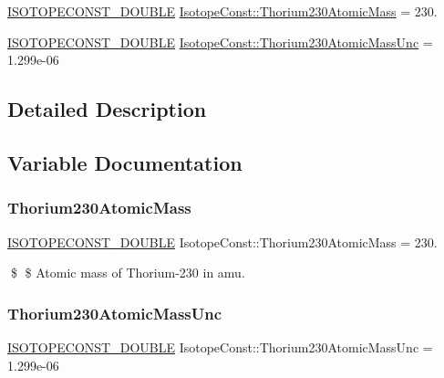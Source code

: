 \begin{DoxyCompactItemize}
\item 
\mbox{\hyperlink{group___isotope_const-_macros_ga8f45a7272ce02c0b4c65c44636ed719a}{I\+S\+O\+T\+O\+P\+E\+C\+O\+N\+S\+T\+\_\+\+D\+O\+U\+B\+LE}} \mbox{\hyperlink{group___isotope_const-_thorium-_th230_ga1b6ff3331cff1716a3ddb1562fb919d6}{Isotope\+Const\+::\+Thorium230\+Atomic\+Mass}} = 230.
\item 
\mbox{\hyperlink{group___isotope_const-_macros_ga8f45a7272ce02c0b4c65c44636ed719a}{I\+S\+O\+T\+O\+P\+E\+C\+O\+N\+S\+T\+\_\+\+D\+O\+U\+B\+LE}} \mbox{\hyperlink{group___isotope_const-_thorium-_th230_ga794d8abb74400c3abca9f6de7f1f3f0f}{Isotope\+Const\+::\+Thorium230\+Atomic\+Mass\+Unc}} = 1.\+299e-\/06
\end{DoxyCompactItemize}


\subsection{Detailed Description}


\subsection{Variable Documentation}
\mbox{\label{group___isotope_const-_thorium-_th230_ga1b6ff3331cff1716a3ddb1562fb919d6}} 
\subsubsection{\texorpdfstring{Thorium230\+Atomic\+Mass}{Thorium230AtomicMass}}
{\footnotesize\ttfamily \mbox{\hyperlink{group___isotope_const-_macros_ga8f45a7272ce02c0b4c65c44636ed719a}{I\+S\+O\+T\+O\+P\+E\+C\+O\+N\+S\+T\+\_\+\+D\+O\+U\+B\+LE}} Isotope\+Const\+::\+Thorium230\+Atomic\+Mass = 230.}

\$ \$ Atomic mass of Thorium-\/230 in amu. \mbox{\label{group___isotope_const-_thorium-_th230_ga794d8abb74400c3abca9f6de7f1f3f0f}} 
\subsubsection{\texorpdfstring{Thorium230\+Atomic\+Mass\+Unc}{Thorium230AtomicMassUnc}}
{\footnotesize\ttfamily \mbox{\hyperlink{group___isotope_const-_macros_ga8f45a7272ce02c0b4c65c44636ed719a}{I\+S\+O\+T\+O\+P\+E\+C\+O\+N\+S\+T\+\_\+\+D\+O\+U\+B\+LE}} Isotope\+Const\+::\+Thorium230\+Atomic\+Mass\+Unc = 1.\+299e-\/06}

